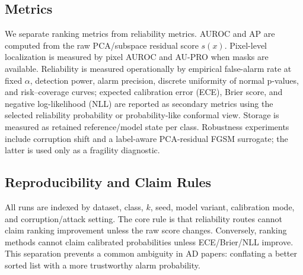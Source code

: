 \subsection{Metrics}
We separate ranking metrics from reliability metrics. AUROC and AP are computed from the raw PCA/subspace residual score $s(x)$. Pixel-level localization is measured by pixel AUROC and AU-PRO when masks are available. Reliability is measured operationally by empirical false-alarm rate at fixed $\alpha$, detection power, alarm precision, discrete uniformity of normal p-values, and risk--coverage curves; expected calibration error (ECE), Brier score, and negative log-likelihood (NLL) are reported as secondary metrics using the selected reliability probability or probability-like conformal view. Storage is measured as retained reference/model state per class. Robustness experiments include corruption shift and a label-aware PCA-residual FGSM surrogate; the latter is used only as a fragility diagnostic.

\subsection{Reproducibility and Claim Rules}
All runs are indexed by dataset, class, $k$, seed, model variant, calibration mode, and corruption/attack setting. The core rule is that reliability routes cannot claim ranking improvement unless the raw score changes. Conversely, ranking methods cannot claim calibrated probabilities unless ECE/Brier/NLL improve. This separation prevents a common ambiguity in AD papers: conflating a better sorted list with a more trustworthy alarm probability.
